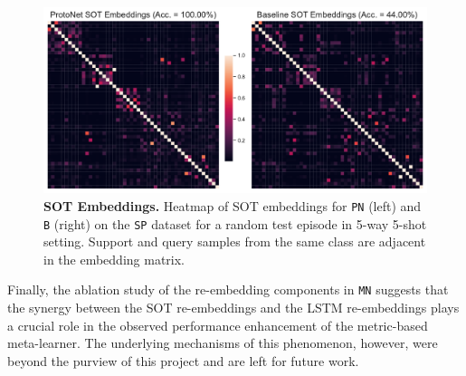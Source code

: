 \begin{figure}[h!]
    \centering
    \includegraphics[width=1\columnwidth]{../figures/sot-embeddings.pdf}
    \caption{\textbf{SOT Embeddings.} Heatmap of SOT embeddings for \texttt{PN} (left) and \texttt{B} (right) on the \texttt{SP} dataset for a random test episode in 5-way 5-shot setting. Support and query samples from the same class are adjacent in the embedding matrix.}
    \label{fig:sot-embeddings}
\end{figure}

Finally, the ablation study of the re-embedding components in \texttt{MN} suggests that the synergy between the SOT re-embeddings and the LSTM re-embeddings plays a crucial role in the observed performance enhancement of the metric-based meta-learner. The underlying mechanisms of this phenomenon, however, were beyond the purview of this project and are left for future work.
